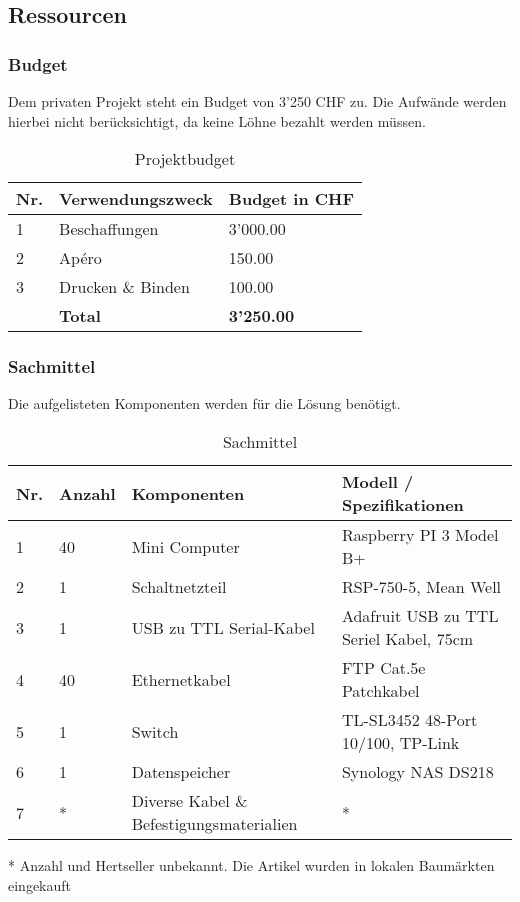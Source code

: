 \subsection{Ressourcen}

\subsubsection{Budget}
Dem privaten Projekt steht ein Budget von 3'250 CHF zu. Die Aufwände werden hierbei nicht berücksichtigt, da keine Löhne bezahlt werden müssen.
\begin{table}[H]
\centering
\begin{tabular}[t]{p{1cm}p{12cm}p{3cm}}
\hline
\rowcolor{heading}\textbf{Nr.} & \textbf{Verwendungszweck} & \textbf{Budget \newline in CHF} \\\hline
1 & Beschaffungen & 3'000.00 \\\hline
2 & Apéro & 150.00 \\\hline
3 & Drucken \& Binden & 100.00 \\\hline
\textbf{} & \textbf{Total} & \textbf{3'250.00}  \\\hline
\end{tabular}
\caption{Projektbudget}
\end{table}

\subsubsection{Sachmittel}
Die aufgelisteten Komponenten werden für die Lösung benötigt.

\begin{table}[H]
\centering
\begin{tabular}[t]{p{1cm}p{1.2cm}p{6.9cm}p{6.9cm}}
\hline
\rowcolor{heading}\textbf{Nr.} & \textbf{Anzahl} & \textbf{Komponenten} & Modell / Spezifikationen\\\hline
1 & 40 & Mini Computer & Raspberry PI 3 Model B+\\\hline
2 & 1 & Schaltnetzteil & RSP-750-5, Mean Well\\\hline
3 & 1 & USB zu TTL Serial-Kabel & Adafruit USB zu TTL Seriel Kabel, 75cm \\\hline
4 & 40 & Ethernetkabel & FTP Cat.5e Patchkabel \\\hline
5 & 1 & Switch & TL-SL3452 48-Port 10/100, TP-Link \\\hline
6 & 1 & Datenspeicher & Synology NAS DS218\\\hline
7 & * & Diverse Kabel \& Befestigungsmaterialien & *\\\hline
\end{tabular}
\caption{Sachmittel}
\end{table}
* Anzahl und Hertseller unbekannt. Die Artikel wurden in lokalen Baumärkten eingekauft